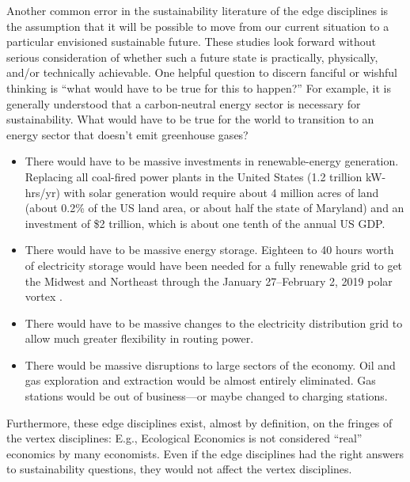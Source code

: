 \documentclass[12pt]{article}
\begin{document}
Another common error in the sustainability literature of the edge disciplines
is the assumption that it will be possible to move 
from our current situation to a particular envisioned sustainable future. 
These studies look forward without
serious consideration of whether such a future state 
is practically, physically, and/or technically achievable. 
One helpful question to discern fanciful or wishful thinking
is ``what would have to be true for this to happen?''
For example, it is generally understood that a carbon-neutral 
energy sector is necessary for sustainability.
What would have to be true for the world to transition to an energy sector 
that doesn't emit greenhouse gases?
%
\begin{itemize}

  \item There would have to be massive investments in renewable-energy generation. 
        Replacing all coal-fired power plants in the United States (1.2 trillion kW-hrs/yr) %
        with solar generation would require about 4 million acres of land 
        (about 0.2\% of the US land area, or about half the state of Maryland) 
        and an investment of \$2 trillion, which is about one tenth of the annual US GDP. 

  \item There would have to be massive energy storage. 
        Eighteen to 40 hours worth of electricity storage would 
        have been needed for a fully renewable grid to get the Midwest and Northeast 
		through the January 27--February 2, 2019 polar vortex \autocite{wood2019}.
		
  \item There would have to be massive changes to the electricity distribution grid
  	to allow much greater flexibility in routing power.
  
  \item There would be massive disruptions to large sectors of the economy. 
        Oil and gas exploration and extraction would be almost entirely eliminated.
		Gas stations would be out of business---or maybe changed to charging stations.

\end{itemize}

Furthermore, these edge disciplines exist, almost by definition, 
on the fringes of the vertex disciplines:
E.g., Ecological Economics is not considered ``real'' economics by many economists.
Even if the edge disciplines had the right answers to sustainability questions, 
they would not affect the vertex disciplines. 
\end{document}
